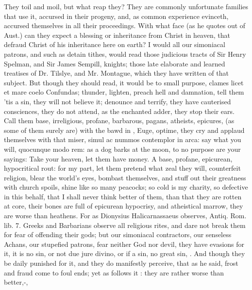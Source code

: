 {{They toil and moil, but what reap they? They are commonly unfortunate
families that use it, accursed in their pro\-geny, and, as common
experience evinceth, accursed themselves in all their proceedings. With
what face (as he quotes out of Aust.) can they expect a blessing
or inheritance from Christ in heaven, that defraud Christ of his
inheritance here on earth? I would all our simoniacal patrons, and such
as detain tithes, would read those judicious tracts of Sir Henry
Spelman, and Sir James Sempill, knights; those late elaborate and
learned treatises of Dr. Tilslye, and Mr. Montague, which they have
written of that subject. But though they should read, it would be to
small purpose, clames licet et mare coelo Confundas; thunder, lighten,
preach hell and damnation, tell them 'tis a sin, they will not believe
it; denounce and terrify, they have cauterised consciences, they
do not attend, as the enchanted adder, they stop their ears. Call them
base, irreligious, profane, barbarous, pagans, atheists, epicures, (as
some of them surely are) with the bawd in \Plautus{}, Euge, optime, they
cry and applaud themselves with that miser, simul ac nummos
contemplor in arca: say what you will, quocunque modo rem: as a dog
barks at the moon, to no purpose are your sayings: Take your heaven,
let them have money. A base, profane, epicurean, hypocritical rout: for
my part, let them pretend what zeal they will, counterfeit religion,
blear the world's eyes, bombast themselves, and stuff out their
greatness with church spoils, shine like so many peacocks; so cold is
my charity, so defective in this behalf, that I shall never think
better of them, than that they are rotten at core, their bones are full
of epicurean hypocrisy, and atheistical marrow, they are worse than
heathens. For as Dionysius Halicarnassaeus observes, Antiq. Rom. lib.
7.  Greeks and Barbarians observe all religious
rites, and dare not break them for fear of offending their gods; but
our simoniacal contractors, our senseless Achans, our stupefied
patrons, fear neither God nor devil, they have evasions for it, it is
no sin, or not due jure divino, or if a sin, no great sin, \etc{}. And
though they be daily punished for it, and they do manifestly perceive,
that as he said, frost and fraud come to foul ends; yet as
\Chrysostom{} follows it :
they are rather worse than better,-,
}}
